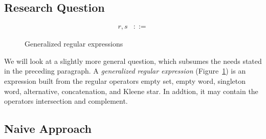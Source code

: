 \subsection{Research Question}
\label{sec:research-question}

\begin{figure}[tp]
  \begin{align*}
    r, s &::= 
  \end{align*}
  \caption{Generalized regular expressions}
  \label{fig:generalized-regular-expressions}
\end{figure}

We will look at a slightly more general question, which subsumes the
needs stated in the preceding paragraph. A \emph{generalized regular
  expression} (Figure~\ref{fig:generalized-regular-expressions}) is an
expression built from the regular operators empty set, empty word,
singleton word, alternative, concatenation, and Kleene star. In
addtion, it may contain the operators intersection and complement.


\subsection{Naive Approach}
\label{sec:naive-approach}




